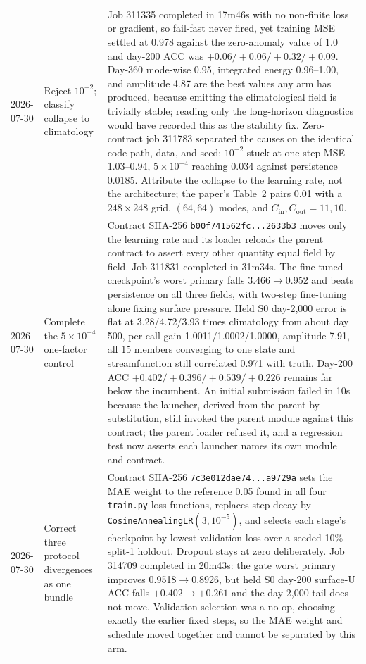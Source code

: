 \documentclass[11pt]{article}
\begin{document}
\begin{longtable}{@{}p{}p{}p{}@{}}
2026-07-30 & Reject \(10^{-2}\); classify collapse to climatology & Job 311335 completed in 17m46s with no non-finite loss or gradient, so fail-fast never fired, yet training MSE settled at 0.978 against the zero-anomaly value of 1.0 and day-200 ACC was \(+0.06/+0.06/+0.32/+0.09\).  Day-360 mode-wise 0.95, integrated energy 0.96--1.00, and amplitude 4.87 are the best values any arm has produced, because emitting the climatological field is trivially stable; reading only the long-horizon diagnostics would have recorded this as the stability fix.  Zero-contract job 311783 separated the causes on the identical code path, data, and seed: \(10^{-2}\) stuck at one-step MSE 1.03--0.94, \(5\times10^{-4}\) reaching 0.034 against persistence 0.0185.  Attribute the collapse to the learning rate, not the architecture; the paper's Table~2 pairs 0.01 with a \(248\times248\) grid, \((64,64)\) modes, and \(C_{\mathrm{in}},C_{\mathrm{out}}=11,10\). \\
2026-07-30 & Complete the \(5\times10^{-4}\) one-factor control & Contract SHA-256 \texttt{b00f741562fc...2633b3} moves only the learning rate and its loader reloads the parent contract to assert every other quantity equal field by field.  Job 311831 completed in 31m34s.  The fine-tuned checkpoint's worst primary falls 3.466\(\rightarrow\)0.952 and beats persistence on all three fields, with two-step fine-tuning alone fixing surface pressure.  Held S0 day-2,000 error is flat at 3.28/4.72/3.93 times climatology from about day 500, per-call gain 1.0011/1.0002/1.0000, amplitude 7.91, all 15 members converging to one state and streamfunction still correlated 0.971 with truth.  Day-200 ACC \(+0.402/+0.396/+0.539/+0.226\) remains far below the incumbent.  An initial submission failed in 10s because the launcher, derived from the parent by substitution, still invoked the parent module against this contract; the parent loader refused it, and a regression test now asserts each launcher names its own module and contract. \\
2026-07-30 & Correct three protocol divergences as one bundle & Contract SHA-256 \texttt{7c3e012dae74...a9729a} sets the MAE weight to the reference 0.05 found in all four \texttt{train.py} loss functions, replaces step decay by \texttt{CosineAnnealingLR}\((3,10^{-5})\), and selects each stage's checkpoint by lowest validation loss over a seeded 10\% split-1 holdout.  Dropout stays at zero deliberately.  Job 314709 completed in 20m43s: the gate worst primary improves 0.9518\(\rightarrow\)0.8926, but held S0 day-200 surface-U ACC falls \(+0.402\rightarrow+0.261\) and the day-2,000 tail does not move.  Validation selection was a no-op, choosing exactly the earlier fixed steps, so the MAE weight and schedule moved together and cannot be separated by this arm. \\

\end{longtable}
\end{document}
